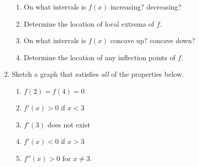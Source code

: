 \documentclass[11pt,fleqn]{article}
\begin{document}
\begin{enumerate}
\begin{multicols}{2}
\begin{enumerate}
\item On what intervals is $f(x)$ increasing? decreasing?
\vfill
\item Determine the location of local extrema of $f$.
\vfill
\item On what intervals is $f(x)$ concave up? concave down?
\vfill
\item Determine the location of any inflection points of $f$.
\vfill
\end{enumerate}
\end{multicols}
\vfill
\item Sketch a graph that satisfies \emph{all} of the properties below.
\begin{enumerate}
\item $f(2)=f(4)=0$
\item $f'(x) > 0$ if $x <3$
\item $f'(3)$ does not exist
\item $f'(x) < 0$ if $x > 3$
\item $f''(x) > 0$ for $x \not=3.$
\end{enumerate}
\vspace{2.5in}
 \end{enumerate}
\end{document}
